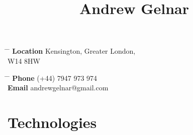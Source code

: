 \documentclass[10pt]{article} %
\begin{document}

\title{Andrew Gelnar} %


\parbox{0.5\textwidth}{ %
\begin{tabbing} %
\hspace{3cm} \= \hspace{4cm} \= \kill %
{\bf Location} \> Kensington, Greater London, \\ %
\> W14 8HW \\ %
\end{tabbing}}
\hfill %
\parbox{0.5\textwidth}{ %
\begin{tabbing} %
\hspace{3cm} \= \hspace{4cm} \= \kill %
{\bf Phone} \> (+44) 7947 973 974 \\ %
{\bf Email} \> andrewgelnar@gmail.com \\ %
\end{tabbing}}





\vspace{-1cm}
\section{Technologies}
\end{document}
